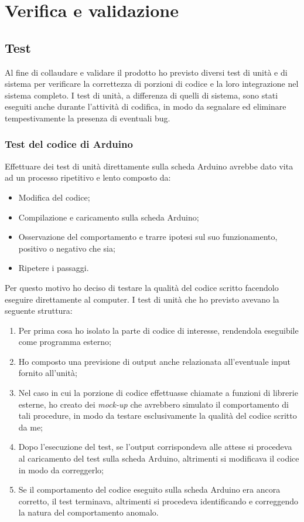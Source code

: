 \section{Verifica e validazione}
\subsection{Test}\label{test}
Al fine di collaudare e validare il prodotto ho previsto diversi test di unità e di sistema per verificare la correttezza di porzioni di codice e la loro integrazione nel sistema completo. I test di unità, a differenza di quelli di sistema, sono stati eseguiti anche durante l'attività di codifica, in modo da segnalare ed eliminare tempestivamente la presenza di eventuali bug.
\subsubsection{Test del codice di Arduino}
Effettuare dei test di unità direttamente sulla scheda Arduino avrebbe dato vita ad un processo ripetitivo e lento composto da:
\begin{itemize}
\item Modifica del codice;
\item Compilazione e caricamento sulla scheda Arduino;
\item Osservazione del comportamento e trarre ipotesi sul suo funzionamento, positivo o negativo che sia;
\item Ripetere i passaggi.
\end{itemize}

Per questo motivo ho deciso di testare la qualità del codice scritto facendolo eseguire direttamente al computer. 
I test di unità che ho previsto avevano la seguente struttura:
\begin{enumerate}
\item Per prima cosa ho isolato la parte di codice di interesse, rendendola eseguibile come programma esterno;
\item Ho composto una previsione di output anche relazionata all'eventuale input fornito all'unità;
\item Nel caso in cui la porzione di codice effettuasse chiamate a funzioni di librerie esterne, ho creato dei \textit{mock-up} che avrebbero simulato il comportamento di tali procedure, in modo da testare esclusivamente la qualità del codice scritto da me;
\item Dopo l'esecuzione del test, se l'output corrispondeva alle attese si procedeva al caricamento del test sulla scheda Arduino, altrimenti si modificava il codice in modo da correggerlo;
\item Se il comportamento del codice eseguito sulla scheda Arduino era ancora corretto, il test terminava, altrimenti si procedeva identificando e correggendo la natura del comportamento anomalo.
\end{enumerate}

